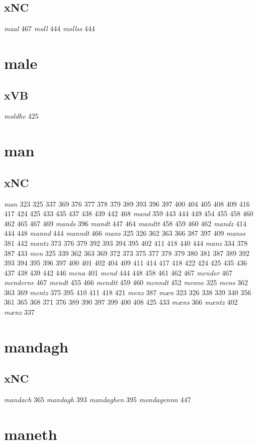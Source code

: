 \documentclass[a4paper,twocolumn]{article}
\begin{document}
\subsection{xNC}
\label{sec:orgf63dd14}
\emph{maal} 467 \emph{moll} 444 \emph{mollss} 444 
\section{male}
\label{sec:org0473bb1}
\subsection{xVB}
\label{sec:orga9102a7}
\emph{moldhe} 425 
\section{man}
\label{sec:orgcadf09e}
\subsection{xNC}
\label{sec:org575be96}
\emph{man} 323 325 337 369 376 377 378 379 389 393 396 397 400 404 405 408 409 416 417 424 425 433 435 437 438 439 442 468 \emph{mand} 359 443 444 449 454 455 458 460 462 465 467 469 \emph{mands} 396 \emph{mandt} 447 464 \emph{mandtt} 458 459 460 462 \emph{mandz} 414 444 448 \emph{mannd} 444 \emph{manndt} 466 \emph{mans} 325 326 362 363 366 387 397 409 \emph{manss} 381 442 \emph{mantz} 373 376 379 392 393 394 395 402 411 418 440 444 \emph{manz} 334 378 387 433 \emph{men} 325 339 362 363 369 372 373 375 377 378 379 380 381 387 389 392 393 394 395 396 397 400 401 402 404 409 411 414 417 418 422 424 425 435 436 437 438 439 442 446 \emph{mena} 401 \emph{mend} 444 448 458 461 462 467 \emph{mender} 467 \emph{menderne} 467 \emph{mendt} 455 466 \emph{mendtt} 459 460 \emph{menndt} 452 \emph{menne} 325 \emph{mens} 362 363 369 \emph{mentz} 375 395 410 411 418 421 \emph{menz} 387 \emph{mæn} 323 326 338 339 340 356 361 365 368 371 376 389 390 397 399 400 408 425 433 \emph{mæns} 366 \emph{mæntz} 402 \emph{mænz} 337 
\section{mandagh}
\label{sec:org64a59fc}
\subsection{xNC}
\label{sec:orge8e4104}
\emph{mandach} 365 \emph{mandagh} 393 \emph{mandaghen} 395 \emph{mondagennn} 447 
\section{maneth}
\label{sec:orga80494a}
\end{document}
